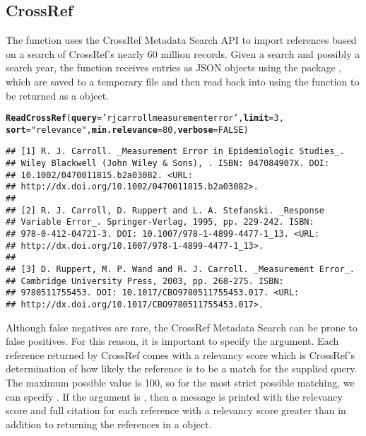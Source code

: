 \documentclass[article]{jss}\usepackage[]{graphicx}\usepackage[]{color}
\makeatletter
\newcommand{\hlnum}[1]{\textcolor[rgb]{0.125,0.125,1}{#1}}%
\newcommand{\hlstr}[1]{\textcolor[rgb]{0.125,0.125,1}{#1}}%
\newcommand{\hlstd}[1]{\textcolor[rgb]{0.251,0.251,0.282}{#1}}%
\newcommand{\hlkwc}[1]{\textcolor[rgb]{0.529,0,0.184}{\textbf{#1}}}%
\newcommand{\hlkwd}[1]{\textcolor[rgb]{0.251,0.251,0.282}{\textbf{#1}}}%
\newenvironment{kframe}{%
 \def\at@end@of@kframe{}%
 \ifinner\ifhmode%
  \def\at@end@of@kframe{\end{minipage}}%
  \begin{minipage}{\columnwidth}%
 \fi\fi%
 \def\FrameCommand##1{\hskip\@totalleftmargin \hskip-\fboxsep
 \colorbox{shadecolor}{##1}\hskip-\fboxsep
     \hskip-\linewidth \hskip-\@totalleftmargin \hskip\columnwidth}%
 \MakeFramed {\advance\hsize-\width
   \@totalleftmargin\z@ \linewidth\hsize
   \@setminipage}}%
 {\par\unskip\endMakeFramed%
 \at@end@of@kframe}
\newenvironment{knitrout}{}{} %
\makeatother
\begin{document}
\subsection{CrossRef}
The function  uses the CrossRef Metadata Search API to import references based on a search of CrossRef's nearly 60 million records.  Given a search and possibly a search year, the function receives \Bibtex{} entries as JSON objects using the  package \citep{RJSONIO}, which are saved to a temporary file and then read back into \R{} using the  function to be returned as a  object.
\begin{knitrout}
\color{fgcolor}\begin{kframe}
\begin{alltt}
\hlkwd{ReadCrossRef}\hlstd{(}\hlkwc{query} \hlstd{=} \hlstr{'rj carroll measurement error'}\hlstd{,} \hlkwc{limit} \hlstd{=} \hlnum{3}\hlstd{,}
             \hlkwc{sort} \hlstd{=} \hlstr{"relevance"}\hlstd{,} \hlkwc{min.relevance} \hlstd{=} \hlnum{80}\hlstd{,} \hlkwc{verbose} \hlstd{=} \hlnum{FALSE}\hlstd{)}
\end{alltt}
\begin{verbatim}
## [1] R. J. Carroll. _Measurement Error in Epidemiologic Studies_.
## Wiley Blackwell (John Wiley & Sons), . ISBN: 047084907X. DOI:
## 10.1002/0470011815.b2a03082. <URL:
## http://dx.doi.org/10.1002/0470011815.b2a03082>.
## 
## [2] R. J. Carroll, D. Ruppert and L. A. Stefanski. _Response
## Variable Error_. Springer-Verlag, 1995, pp. 229-242. ISBN:
## 978-0-412-04721-3. DOI: 10.1007/978-1-4899-4477-1_13. <URL:
## http://dx.doi.org/10.1007/978-1-4899-4477-1_13>.
## 
## [3] D. Ruppert, M. P. Wand and R. J. Carroll. _Measurement Error_.
## Cambridge University Press, 2003, pp. 268-275. ISBN:
## 9780511755453. DOI: 10.1017/CBO9780511755453.017. <URL:
## http://dx.doi.org/10.1017/CBO9780511755453.017>.
\end{verbatim}
\end{kframe}
\end{knitrout}


Although false negatives are rare, the CrossRef Metadata Search can be prone to false positives.  For this reason, it is important to specify the  argument.  Each reference returned by CrossRef comes with a relevancy score which is CrossRef's determination of how likely the reference is to be a match for the supplied query.  The maximum possible value is 100, so for the most strict possible matching, we can specify .  If the argument  is , then a message is printed with the relevancy score and full citation for each reference with a relevancy score greater than  in addition to returning the references in a  object.
\end{document}
